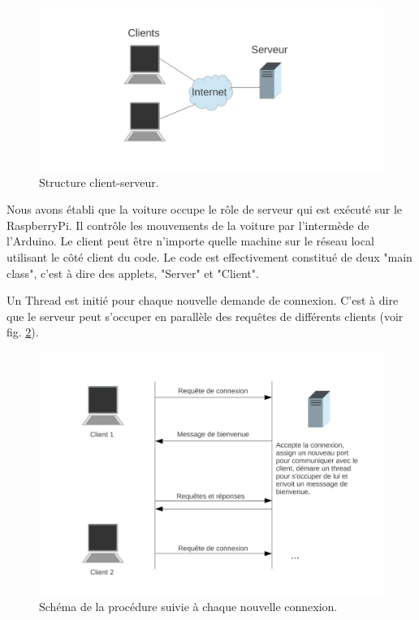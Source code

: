 \documentclass[a4paper,11pt]{report}
\begin{document}
{\begin{figure}[h]
\includegraphics[width=1.0\textwidth]{figures/Client_Server1.pdf}
\caption[Structure client-serveur]{\label{ClientServer1}Structure client-serveur.}
\end{figure}

Nous avons établi que la voiture occupe le rôle de serveur qui est exécuté sur le RaspberryPi. Il contrôle les mouvements de la voiture par l'intermède de l'Arduino. Le client peut être n'importe quelle machine sur le réseau local utilisant le côté client du code. Le code est effectivement constitué de deux "main class", c'est à dire des applets, "Server" et "Client". 

Un Thread est initié pour chaque nouvelle demande de connexion. C'est à dire que le serveur peut s'occuper en parallèle des requêtes de différents clients (voir fig. \ref{ClientServer2}). 

\begin{figure}[h]
\includegraphics[width=1.0\textwidth]{figures/Client_Server2.pdf}
\caption[Connexion d'un nouveau client]{\label{ClientServer2}Schéma de la procédure suivie à chaque nouvelle connexion.}
\end{figure}


}
\end{document}
